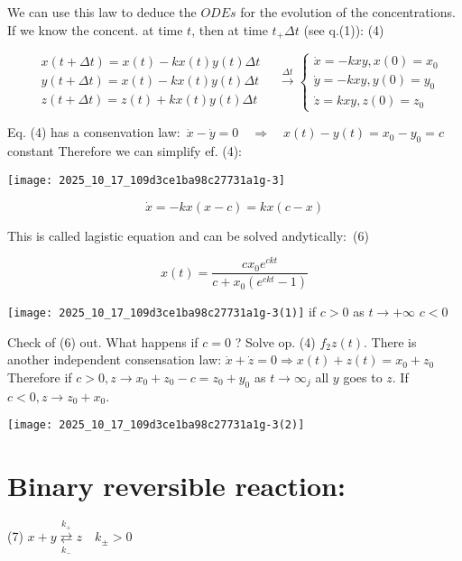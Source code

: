 We can use this law to deduce the $O D E s$ for the evolution of the concentrations. If we know the concent. at time $t$, then at time $t_{+} \Delta t$ (see q.(1)):
(4)

$$ 
 \begin{aligned}
& x(t+\Delta t)=x(t)-k x(t) y(t) \Delta t \\
& y(t+\Delta t)=x(t)-k x(t) y(t) \Delta t \\
& z(t+\Delta t)=z(t)+k x(t) y(t) \Delta t
\end{aligned} \quad \xrightarrow{\Delta t}\left\{\begin{array}{l}
\dot{x}=-k x y, x(0)=x_{0} \\
\dot{y}=-k x y, y(0)=y_{0} \\
\dot{z}=k x y, z(0)=z_{0}
\end{array}\right.
$$ 

Eq. (4) has a consenvation law:\
$\dot{x}-\dot{y}=0 \quad \Rightarrow \quad x(t)-y(t)=x_{0}-y_{0}=c$ constant Therefore we can simplify ef. (4):\
\begin{center}
\texttt{[image: 2025\_10\_17\_109d3ce1ba98c27731a1g-3]}
\end{center}


\begin{equation*}
\dot{x}=-k x(x-c)=k x(c-x) \tag{5}
\end{equation*}


This is called lagistic equation and can be solved andytically:\
(6)

$$ 
x(t)=\frac{c x_{0} e^{c k t}}{c+x_{0}\left(e^{c k t}-1\right)} 
$$ 

\texttt{[image: 2025\_10\_17\_109d3ce1ba98c27731a1g-3(1)]} if $c>0$ as $t \rightarrow+\infty$
\if $c<0$

Check of (6) out. What happens if $c=0$ ? Solve op. (4) $f_{2} z(t)$. There is another independent consensation law: $\dot{x}+\dot{z}=0 \Rightarrow x(t)+z(t)=x_{0}+z_{0}$ Therefore if $c>0, z \longrightarrow x_{0}+z_{0}-c=z_{0}+y_{0}$ as $t \rightarrow \infty_{j}$ all $y$ goes to $z$. If $c<0, z \rightarrow z_{0}+x_{0}$.\
\begin{center}
\texttt{[image: 2025\_10\_17\_109d3ce1ba98c27731a1g-3(2)]}
\end{center}

\section*{Binary reversible reaction:}
(7) $x+y \underset{k_{-}}{\stackrel{k_{+}}{\rightleftarrows}} z \quad k_{ \pm}>0$

